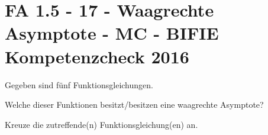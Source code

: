 \section{FA 1.5 - 17 - Waagrechte Asymptote - MC - BIFIE Kompetenzcheck 2016}

\begin{beispiel}[FA 1.5]{1} %
				Gegeben sind fünf Funktionsgleichungen.

Welche dieser Funktionen besitzt/besitzen eine waagrechte Asymptote?

Kreuze die zutreffende(n) Funktionsgleichung(en) an.

\end{beispiel}	